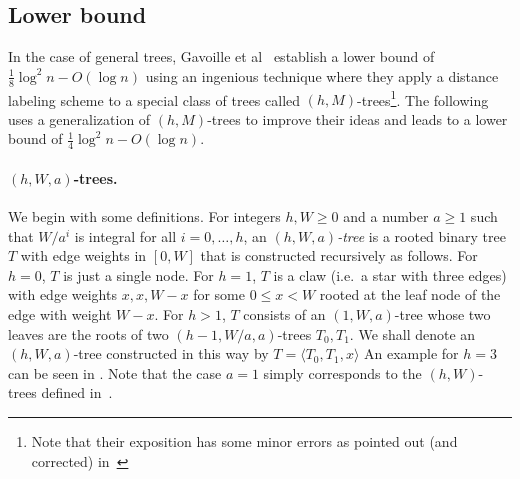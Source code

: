 

\subsection{Lower bound}

In the case of general trees, Gavoille et al~\cite{Gavoille200485} establish a lower bound  of $\frac{1}{8}\log^2 n-O(\log n)$ using an ingenious technique where they apply a distance labeling scheme to a special class of trees called $(h,M)$-trees\footnote{Note that their exposition has some minor errors as pointed out (and corrected) in~\cite{esbenthesis}}. The following uses a generalization of $(h,M)$-trees to improve their ideas and leads to a lower bound of $\frac{1}{4}\log^2 n-O(\log n)$.

\paragraph{$(h,W,a)$-trees.}
We begin with some definitions. For integers $h,W\geq 0$ and a number $a\geq 1$ such that $W/a^i$ is integral for all $i=0,\dots ,h$, an \emph{$(h,W,a)$-tree} is a rooted binary tree $T$ with edge weights in $[0,W]$ that is constructed recursively as follows. For $h=0$, $T$ is just a single node. For $h=1$, $T$ is a claw (i.e.\ a star with three edges) with edge weights $x,x,W-x$ for some $0\leq x<W$ rooted at the leaf node of the edge with weight $W-x$. For $h>1$, $T$ consists of an $(1,W,a)$-tree whose two leaves are the roots of two $(h-1,W/a,a)$-trees $T_0,T_1$.  We shall denote an $(h,W,a)$-tree constructed in this way by $T=\langle T_0,T_1,x\rangle$
An example for $h=3$ can be seen in . Note that the case $a=1$ simply corresponds to the $(h,W)$-trees defined in~\cite{Gavoille200485}.

